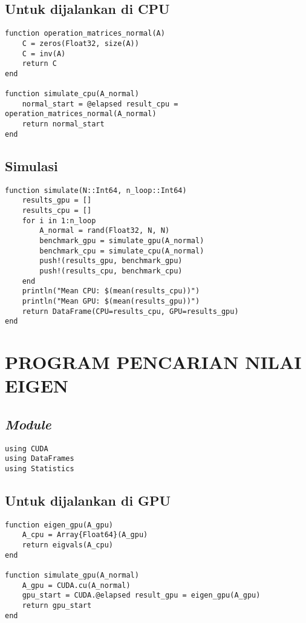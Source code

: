 \section{Untuk dijalankan di CPU}

\begin{lstlisting}
function operation_matrices_normal(A)
    C = zeros(Float32, size(A))
    C = inv(A)
    return C
end

function simulate_cpu(A_normal)
    normal_start = @elapsed result_cpu = operation_matrices_normal(A_normal)
    return normal_start
end
\end{lstlisting}

\section{Simulasi}

\begin{lstlisting}
function simulate(N::Int64, n_loop::Int64)
    results_gpu = []
    results_cpu = []
    for i in 1:n_loop
        A_normal = rand(Float32, N, N)
        benchmark_gpu = simulate_gpu(A_normal)
        benchmark_cpu = simulate_cpu(A_normal)
        push!(results_gpu, benchmark_gpu)
        push!(results_cpu, benchmark_cpu)
    end
    println("Mean CPU: $(mean(results_cpu))")
    println("Mean GPU: $(mean(results_gpu))")
    return DataFrame(CPU=results_cpu, GPU=results_gpu)
end
\end{lstlisting}

\chapter{PROGRAM PENCARIAN NILAI EIGEN}
\label{appx:eigenvalue}

\section{\emph{Module}}

\begin{lstlisting}
using CUDA
using DataFrames
using Statistics
\end{lstlisting}

\section{Untuk dijalankan di GPU}

\begin{lstlisting}
function eigen_gpu(A_gpu)
    A_cpu = Array{Float64}(A_gpu)
    return eigvals(A_cpu)
end

function simulate_gpu(A_normal)
    A_gpu = CUDA.cu(A_normal)
    gpu_start = CUDA.@elapsed result_gpu = eigen_gpu(A_gpu)
    return gpu_start
end
\end{lstlisting}

